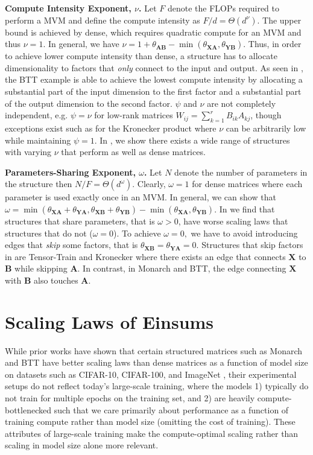 \documentclass{article}
\newcommand{\mbf}[1]{{\boldsymbol{\mathbf{#1}}}}
\newcommand{\bm}{\mbf}
\begin{document}
\noindent \textbf{Compute Intensity Exponent, $\nu$.} \quad
Let $F$ denote the FLOPs required to perform a MVM and define the compute intensity as $F/d = \Theta\left(d^{\nu}\right)$.
The upper bound is achieved by dense, which requires quadratic compute for an MVM and thus $\nu=1$.
In general, we have $\nu=1 + \theta_{\bm{A} \bm{B}} - \min(\theta_{\bm{X}\bm{A}}, \theta_{\bm{Y} \bm{B}})$.
Thus, in order to achieve lower compute intensity than dense, a structure has to allocate dimensionality to factors that \emph{only} connect to the input and output.
As seen in , the BTT example is able to achieve the lowest compute intensity by allocating a substantial part of the input dimension to the first factor
and a substantial part of the output dimension to the second factor. $\psi$ and $\nu$ are not completely independent, e.g. $\psi=\nu$ for low-rank matrices $W_{ij} = \sum_{k=1}^{r} B_{ik} A_{kj}$, though exceptions exist such as for the Kronecker product where $\nu$ can be arbitrarily low while maintaining $\psi = 1$. In , we show there exists a wide range of structures with varying $\nu$ that perform as well as dense matrices.

\noindent \textbf{Parameters-Sharing Exponent, $\omega$.} \quad
Let $N$ denote the number of parameters in the structure then $N / F = \Theta\left(d^{\omega}\right)$.
Clearly, $\omega=1$ for dense matrices where each parameter is used exactly once in an MVM. In general, we can show that $\omega = \min(\theta_{\bm{X} \bm{A}} + \theta_{\bm{Y}\bm{A}}, \theta_{\bm{X}\bm{B}} + \theta_{\bm{Y} \bm{B}})
- \min(\theta_{\bm{X} \bm{A}}, \theta_{\bm{Y} \bm{B}})$.
In  we find that structures that share parameters, that is $\omega > 0$, have worse scaling laws that structures that do not ($\omega=0$).
To achieve $\omega=0,$ we have to avoid introducing edges that \emph{skip} some factors, that is $\theta_{\bm{X}\bm{B}} = \theta_{\bm{Y}\bm{A}} = 0$.
Structures that skip factors in  are Tensor-Train and Kronecker where there exists an edge that connects $\bm{X}$ to $\bm{B}$ while skipping $\bm{A}$. In contrast, in Monarch and BTT, the edge connecting $\bm{X}$ with $\bm{B}$ also touches $\bm{A}$.


\section{Scaling Laws of Einsums} \label{sec:experiments}
While prior works have shown that certain structured matrices such as Monarch and BTT have better scaling laws than dense matrices as a function of model size on datasets such as CIFAR-10, CIFAR-100, and ImageNet \citep{dao2022monarch, qiu2024compute}, their experimental setups do not reflect today's large-scale training, where the models 1) typically do not train for multiple epochs on the training set, and 2) are heavily compute-bottlenecked such that we care primarily about performance as a function of training compute rather than model size (omitting the cost of training). These attributes of large-scale training make the compute-optimal scaling rather than scaling in model size alone more relevant.
\end{document}
